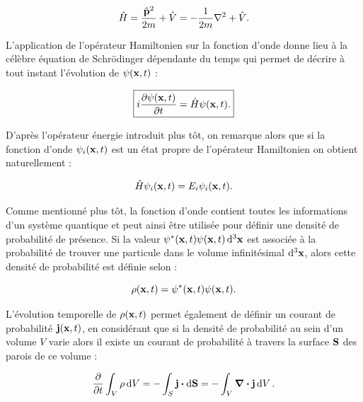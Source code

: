         \begin{equation}
                \hat{H}=\frac{\hat{\vb{p}}^2}{2m}+\hat{V}=-\frac{1}{2m}\laplacian + \hat{V}.
        \end{equation}
        
        L'application de l'opérateur Hamiltonien sur la fonction d'onde donne lieu à la célèbre équation de Schrödinger dépendante du temps qui permet de décrire à tout instant l'évolution de $\psi(\vb{x},t)$ :
        
        \begin{equation}
        \boxed{
            i\pdv{\psi(\vb{x},t)}{t}=\hat{H}\psi(\vb{x},t).
        }
        \end{equation}
        
        D'après l'opérateur énergie introduit plus tôt, on remarque alors que si la fonction d'onde $\psi_i(\vb{x},t)$ est un état propre de l'opérateur Hamiltonien on obtient naturellement :
        
        \begin{equation}
            \hat{H}\psi_i(\vb{x},t)=E_i\psi_i(\vb{x},t).
        \end{equation}
        
        Comme mentionné plus tôt, la fonction d'onde contient toutes les informations d'un système quantique et peut ainsi être utilisée pour définir une densité de probabilité de présence. Si la valeur $\psi^*(\vb{x},t)\psi(\vb{x},t)\dd[3]{\vb{x}}$ est associée à la probabilité de trouver une particule dans le volume infinitésimal $\dd[3]{\vb{x}}$, alors cette densité de probabilité est définie selon :
        
        \begin{equation}
            \rho(\vb{x},t)=\psi^*(\vb{x},t)\psi(\vb{x},t).
        \end{equation}
        
        L'évolution temporelle de $\rho(\vb{x},t)$ permet également de définir un courant de probabilité $\vb{j}(\vb{x},t)$, en considérant que si la densité de probabilité au sein d'un volume $V$ varie alors il existe un courant de probabilité à travers la surface $\vb{S}$ des parois de ce volume :
        
        \begin{equation}
            \pdv{t}\int_V\rho\dd{V}=-\int_S\vb{j}\vdot \dd{\vb{S}}=-\int_V\grad\vdot\vb{j}\dd{V}.
            \label{div}
        \end{equation}

